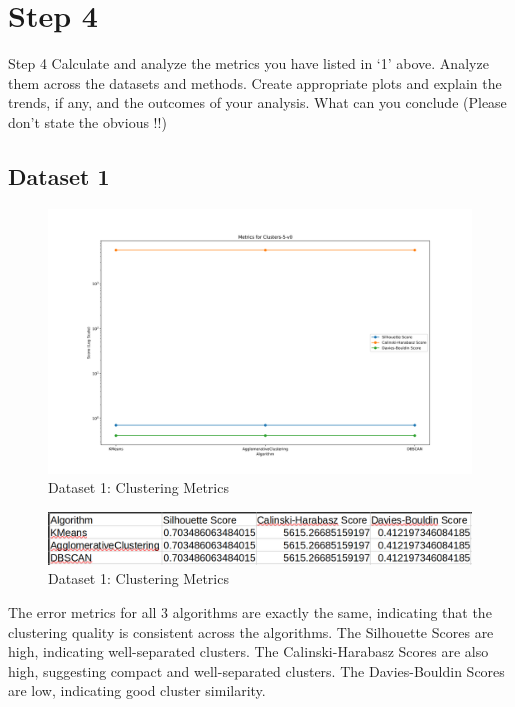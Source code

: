 \section*{Step 4}

\begin{custombox}[label={box:Q4}]{Step 4}
	Calculate and analyze the metrics you have listed in ‘1’ above. Analyze them across the datasets and methods. Create appropriate plots and explain the trends, if any, and the outcomes of your analysis. What can you conclude (Please don’t state the obvious !!)
\end{custombox}

\subsection*{Dataset 1}

\begin{figure}[H]
	\centering
	\includegraphics[width=0.8\linewidth]{Metrics/Clusters-5-v0-metrics.png}
	\caption{Dataset 1: Clustering Metrics}
	\label{fig:clusters-5-v0-metrics}
\end{figure}

\begin{figure}[H]
	\centering
	\includegraphics[width=0.9\linewidth]{Metrics/dataset-1.png}
	\caption{Dataset 1: Clustering Metrics}
	\label{fig:dataset-1}
\end{figure}

The error metrics for all 3 algorithms are exactly the same, indicating that the clustering quality is consistent across the algorithms. The Silhouette Scores are high, indicating well-separated clusters. The Calinski-Harabasz Scores are also high, suggesting compact and well-separated clusters. The Davies-Bouldin Scores are low, indicating good cluster similarity.


